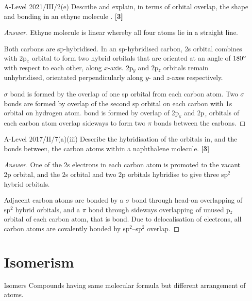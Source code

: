 \documentclass[12pt,a4 paper]{article}
\begin{document}
\begin{exercise}{A-Level 2021/III/2(e)}{}
Describe and explain, in terms of orbital overlap, the shape and bonding in an ethyne molecule . \hfill \textbf{[3]}
\end{exercise}
\begin{proof}[Answer]
Ethyne molecule is linear whereby all four atoms lie in a straight line. 

Both carbons are sp-hybridised. In an sp-hybridised carbon, 2s orbital combines with 2p$_x$ orbital to form two hybrid orbitals that are oriented at an angle of $180\degree$ with respect to each other, along $x$-axis. 2p$_y$ and 2p$_z$ orbitals remain unhybridised, orientated perpendicularly along $y$- and $z$-axes respectively.

 $\sigma$ bond is formed by the overlap of one sp orbital from each carbon atom. Two  $\sigma$ bonds are formed by overlap of the second sp orbital on each carbon with 1s orbital on hydrogen atom.  bond is formed by overlap of 2p$_y$ and 2p$_z$ orbitals of each carbon atom overlap sideways to form two $\pi$ bonds between the carbons.
\end{proof}

\begin{exercise}{A-Level 2017/II/7(a)(iii)}{}
Describe the hybridisation of the orbitals in, and the bonds between, the carbon atoms within a naphthalene molecule. \hfill \textbf{[3]}
\end{exercise}
\begin{proof}[Answer]
One of the 2s electrons in each carbon atom is promoted to the vacant 2p orbital, and the 2s orbital and two 2p orbitals hybridise to give three sp$^2$ hybrid orbitals.

Adjacent carbon atoms are bonded by a $\sigma$ bond through head-on overlapping of sp$^2$ hybrid orbitals, and a $\pi$ bond through sideways overlapping of unused p$_z$ orbital of each carbon atom, that is  bond. Due to delocalisation of electrons, all carbon atoms are covalently bonded by sp$^2$--sp$^2$ overlap.
\end{proof}
\pagebreak

\section{Isomerism}
\begin{defn}{Isomers}{}
Compounds having same molecular formula but different arrangement of atoms.
\end{defn}
\end{document}
